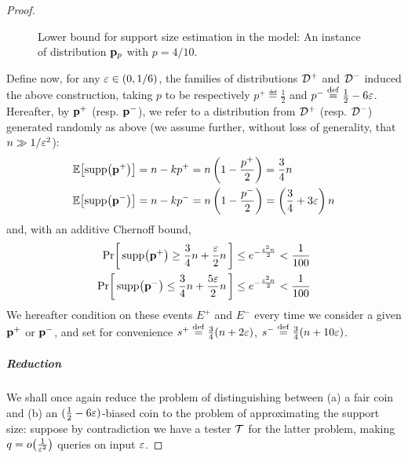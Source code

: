 \begin{proof}
\begin{figure}[!ht]
\caption{\label{fig:construction:lb:support:size:D}Lower bound for support size estimation in the \pdfsamp model: An instance of distribution $\mathbf{p}_p$ with $p=4/10$.}
\end{figure}
Define now, for any $\varepsilon\in(0,1/6)$, the families of distributions $\mathcal{D}^+$ and $\mathcal{D}^-$ induced the above construction, taking $p$ to be respectively $p^+\eqdef \frac{1}{2}$ and $p^-\stackrel{\rm def}{=} \frac{1}{2}-6\varepsilon$. Hereafter, by $\mathbf{p}^+$ (resp. $\mathbf{p}^-$), we refer to a distribution from $\mathcal{D}^+$ (resp. $\mathcal{D}^-$) generated randomly as above (we assume further, without loss of generality, that $n\gg 1/\varepsilon^2$):
\begin{align*}
 \mathbb{E}\!\left[ \operatorname{supp}\!\left(\mathbf{p}^+\right) \right] &= n - kp^+ = n\left(1-\frac{p^+}{2}\right) = \frac{3}{4}n \\
 \mathbb{E}\!\left[ \operatorname{supp}\!\left(\mathbf{p}^{\vphantom{+}-}\right) \right] &= n - kp^- = n\left(1-\frac{p^-}{2}\right) = \left(\frac{3}{4}+3\varepsilon\right)n
\end{align*}
and, with an additive Chernoff bound,
\begin{align*}
 \Pr\!\left[\,  \operatorname{supp}\!\left(\mathbf{p}^+\right) \geq \frac{3}{4}n + \frac{\varepsilon}{2} n\, \right]  &\leq e^{ -\frac{\varepsilon^2 n}{2} } < \frac{1}{100} \\
 \Pr\!\left[\,  \operatorname{supp}\!\left(\mathbf{p}^-\right) \leq \frac{3}{4}n + \frac{5\varepsilon}{2} n\, \right] &\leq e^{ -\frac{\varepsilon^2 n}{2} } < \frac{1}{100}
\end{align*}
We hereafter condition on these events $E^+$ and $E^-$ every time we consider a given $\mathbf{p}^+$ or $\mathbf{p}^-$, and set for convenience $s^+\stackrel{\rm def}{=} \frac{3}{4}(n + 2\varepsilon)$, $s^-\stackrel{\rm def}{=} \frac{3}{4}(n + 10\varepsilon)$.

\subparagraph{Reduction}  We shall once again reduce the problem of distinguishing between \textsf{(a)} a fair coin and \textsf{(b)} an $(\frac{1}{2}-6\varepsilon)$-biased coin to the problem of approximating the support size: suppose by contradiction we have a tester $\mathcal{T}$ for the latter problem, making $q=\littleO{\frac{1}{\eps^2}}$ queries on input $\varepsilon$.


\end{proof}
